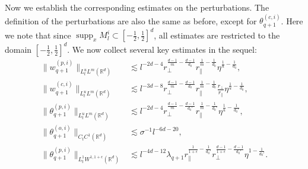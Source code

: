 \documentclass[UTF-8,reqno]{amsart}
\numberwithin{equation}{section}
\theoremstyle{definition}
\DeclareMathOperator{\supp}{supp}
\def\({{\Big(}}
\def\){{\Big)}}
\newcommand{\norm}[1]{\left\|#1\right\|}
\def\geq{\geqslant}
\def\({{\Big(}}
\def\){{\Big)}}
\def\geq{\geqslant}
\begin{document}
Now we   establish the corresponding estimates on the perturbations.  
  The definition of the perturbations are also  the same as before, except for $\theta_{q+1}^{(c,i)}$.  
 Here we note that since $\supp_x M_l^i\subset [-\frac12,\frac12]^d$, all estimates  are restricted to the domain $ [-\frac12,\frac12]^d$.
We now collect several key estimates   in the sequel:
  \begin{align*}
\|w_{q+1}^{(p,i)}\|_{L^u_tL^m(\mathbb{R}^d)}%
&\lesssim l^{-2d-4}r_\perp^{\frac{d-1}{m}-\frac{d-1}{d_0}} r_\parallel^{\frac{1}{m}-\frac{1}{d_0}}\eta^{\frac1u-\frac1{d_0}}, \\
\|w_{q+1}^{(c,i)}\|_{L^u_tL^m(\mathbb{R}^d)}%
&\lesssim l^{-3d-8}r_\perp^{\frac{d-1}{m}-\frac{d-1}{d_0}} r_\parallel^{\frac{1}{m}-\frac{1}{d_0}}\frac{r_\perp}{ r_\parallel}\eta^{\frac1u-\frac1{d_0}},\\
\|\theta_{q+1}^{(p,i)} \|_{L^u_tL^{m}(\mathbb{R}^d)}%
&\lesssim l^{-2d-4}r_\perp^{\frac{d-1}{m}-\frac{d-1}{d_0'}} r_\parallel^{\frac{1}{m}-\frac{1}{d_0'}}\eta^{\frac1u-\frac{1}{d_0'}},\\
\|\theta_{q+1}^{(o,i)}\|_{C_tC^1(\mathbb{R}^d)} 
&\lesssim \sigma^{-1} l^{-6d-20},\\%
\|\theta_{q+1}^{(p,i)}\|_{L^1_tW^{1,1+\epsilon}(\mathbb{R}^d)}%
&\lesssim l^{-4d-12}\lambda_{q+1}r_\parallel^{\frac1{1+\epsilon}-\frac{1}{d_0'}}r_\perp^{\frac{d-1}{1+\epsilon}-\frac{d-1}{d_0'}}\eta^{1-\frac1{d_0'}}.
\end{align*}
\end{document}
